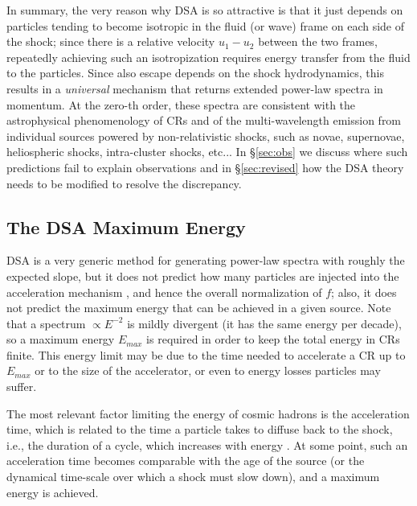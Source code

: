 \documentclass[varenna]{cimento}
\begin{document}
In summary, the very reason why DSA is so attractive is that it just depends on particles tending to become isotropic in the fluid (or wave) frame on each side of the shock; 
since there is a relative velocity $u_1-u_2$ between the two frames, repeatedly achieving such an isotropization requires energy transfer from the fluid to the particles.
Since also escape depends on the shock hydrodynamics, this results in a \emph{universal} mechanism that returns extended power-law spectra in momentum.
At the zero-th order, these spectra are consistent with the astrophysical phenomenology of CRs and of the multi-wavelength emission from individual sources powered by non-relativistic shocks, such as novae, supernovae, heliospheric shocks, intra-cluster shocks, etc...
In \S\ref{sec:obs} we discuss where such predictions fail to explain observations and in \S\ref{sec:revised} how the DSA theory needs to be modified to resolve the discrepancy.

\subsection{The DSA Maximum Energy}
DSA is a very generic method for generating power-law spectra with roughly the expected slope, but it does not predict how many particles are injected into the acceleration mechanism \cite{blasi+05, caprioli+15}, and hence the overall normalization of $f$; 
also, it does not predict the maximum energy that can be achieved in a given source.
Note that a spectrum $\propto E^{-2}$ is mildly divergent (it has the same energy per decade), so a maximum energy $E_{max}$ is required in order to keep the total energy in CRs finite.
This energy limit may be due to the time needed to accelerate a CR up to $E_{max}$ or to the size of the accelerator, or even to energy losses particles may suffer.

The most relevant factor limiting the energy of cosmic hadrons is the acceleration time, which is related to the time a particle takes to diffuse back to the shock, i.e., the duration of a cycle, which increases with energy \cite{drury83}.
At some point, such an acceleration time becomes comparable with the age of the source (or the dynamical time-scale over which a shock must slow down), and a maximum energy is achieved. 
\end{document}
